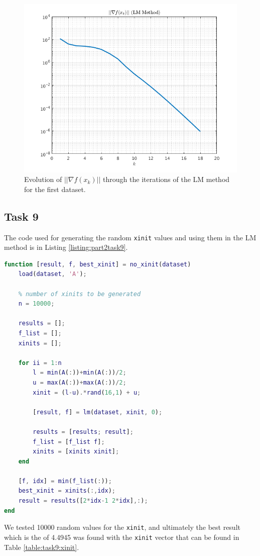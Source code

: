 \begin{figure}[H]
    \centering    
    \includegraphics[width=0.5\linewidth]{part2/figures/task8_norm.png}
    \caption{Evolution of $||\nabla f(x_k) ||$ through the iterations of the LM method for the first dataset.}
    \label{fig:task8:norm}
\end{figure}

\subsection{Task 9}

The code used for generating the random \texttt{xinit} values and using them in the LM method is in Listing \ref{listing:part2task9}.

\begin{lstlisting}[language=Matlab, caption=Matlab code for task 9., label=listing:part2task9]
function [result, f, best_xinit] = no_xinit(dataset)
    load(dataset, 'A');
    
    % number of xinits to be generated
    n = 10000;

    results = [];
    f_list = [];
    xinits = [];
    
    for ii = 1:n
        l = min(A(:))+min(A(:))/2;
        u = max(A(:))+max(A(:))/2;
        xinit = (l-u).*rand(16,1) + u;

        [result, f] = lm(dataset, xinit, 0);
        
        results = [results; result];
        f_list = [f_list f];
        xinits = [xinits xinit];
    end
    
    [f, idx] = min(f_list(:));
    best_xinit = xinits(:,idx);
    result = results([2*idx-1 2*idx],:);
end
\end{lstlisting}

We tested 10000 random values for the \texttt{xinit}, and ultimately the best result which is the  of 4.4945 was found with the \texttt{xinit} vector that can be found in Table \ref{table:task9:xinit}. 

